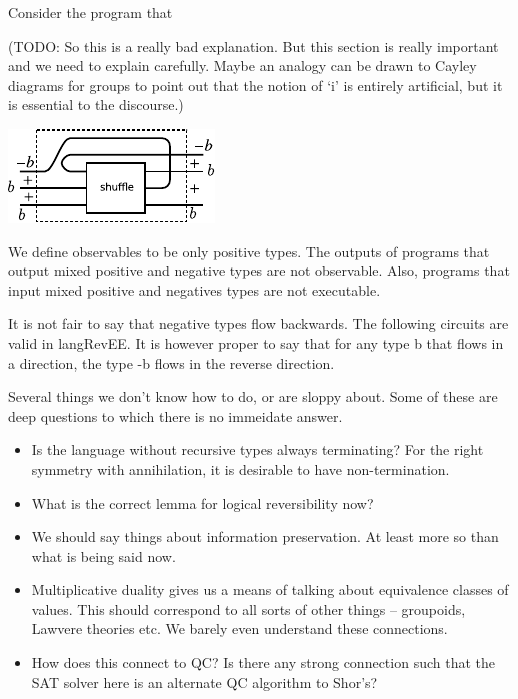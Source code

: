 \documentclass[preprint]{sigplanconf}
\begin{document}
Consider the program that

(TODO: So this is a really bad explanation. But this section is really
important and we need to explain carefully. Maybe an analogy can be
drawn to Cayley diagrams for groups to point out that the notion of
`i' is entirely artificial, but it is essential to the discourse.)

\begin{center}
  \includegraphics{diagrams/shuffle.pdf}
\end{center}

We define observables to be only positive types. The outputs of
programs that output mixed positive and negative types are not
observable.  Also, programs that input mixed positive and negatives
types are not executable.

It is not fair to say that negative types flow backwards. The
following circuits are valid in {{langRevEE}}. It is however proper to
say that for any type {{b}} that flows in a direction, the type {{-b}}
flows in the reverse direction.

Several things we don't know how to do, or are sloppy about. Some of
these are deep questions to which there is no immeidate answer.

\begin{itemize}

\item Is the language without recursive types always terminating? For
  the right symmetry with annihilation, it is desirable to have
  non-termination.

\item What is the correct lemma for logical reversibility now?

\item We should say things about information preservation. At least
  more so than what is being said now.


\item Multiplicative duality gives us a means of talking about
  equivalence classes of values. This should correspond to all sorts
  of other things -- groupoids, Lawvere theories etc. We barely even
  understand these connections.

\item How does this connect to QC? Is there any strong connection such
  that the SAT solver here is an alternate QC algorithm to Shor's?

\end{itemize}
\end{document}
